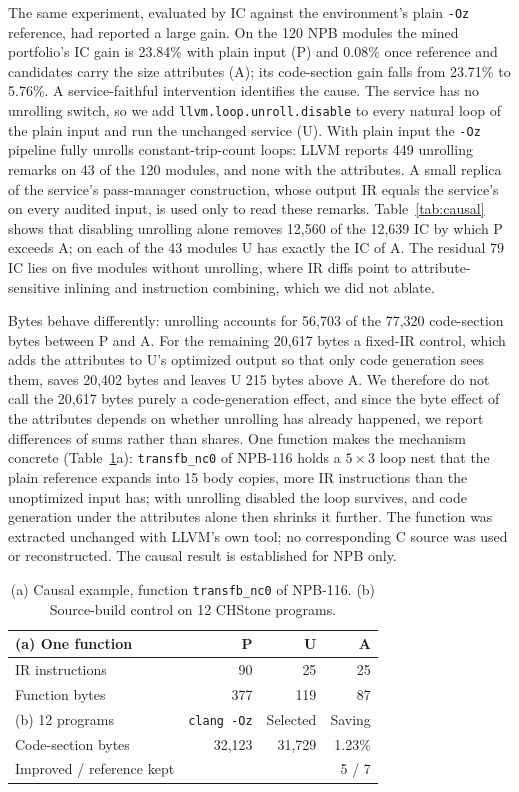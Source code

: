 \documentclass[conference,a4paper]{IEEEtran}
\begin{document}
The same experiment, evaluated by IC against the environment's plain
\texttt{-Oz} reference, had reported a large gain. On the 120 NPB
modules the mined portfolio's IC gain is 23.84\% with plain input (P)
and 0.08\% once reference and candidates carry the size attributes (A);
its code-section gain falls from 23.71\% to 5.76\%. A service-faithful
intervention identifies the cause. The service has no unrolling switch,
so we add \texttt{llvm.loop.unroll.disable} to every natural loop of
the plain input and run the unchanged service (U). With plain input the
\texttt{-Oz} pipeline fully unrolls constant-trip-count loops: LLVM
reports 449 unrolling remarks on 43 of the 120 modules, and none with
the attributes. A small replica of the service's pass-manager
construction, whose output IR equals the service's on every audited
input, is used only to read these remarks. Table~\ref{tab:causal} shows
that disabling unrolling alone removes 12,560 of the 12,639 IC by which
P exceeds A; on each of the 43 modules U has exactly the IC of A. The
residual 79 IC lies on five modules without unrolling, where IR diffs
point to attribute-sensitive inlining and instruction combining, which
we did not ablate.

Bytes behave differently: unrolling accounts for 56,703 of the 77,320
code-section bytes between P and A. For the remaining 20,617 bytes a
fixed-IR control, which adds the attributes to U's optimized output so
that only code generation sees them, saves 20,402 bytes and leaves U
215 bytes above A. We therefore do not call the 20,617 bytes purely a
code-generation effect, and since the byte effect of the attributes
depends on whether unrolling has already happened, we report
differences of sums rather than shares. One function makes the
mechanism concrete (Table~\ref{tab:small}a): \texttt{transfb\_nc0} of
NPB-116 holds a $5{\times}3$ loop nest that the plain reference expands
into 15 body copies, more IR instructions than the unoptimized input
has; with unrolling disabled the loop survives, and code generation
under the attributes alone then shrinks it further. The function was
extracted unchanged with LLVM's own tool; no corresponding C source was
used or reconstructed. The causal result is established for NPB only.



\begin{table}[t]
\caption{(a) Causal example, function \texttt{transfb\_nc0} of NPB-116.
(b) Source-build control on 12 CHStone programs.}
\label{tab:small}
\centering
\footnotesize
\setlength{\tabcolsep}{4pt}
\begin{tabular}{lrrr}
\toprule
(a) One function & P & U & A \\
\midrule
IR instructions & 90 & 25 & 25 \\
Function bytes  & 377 & 119 & 87 \\
\midrule
(b) 12 programs & \texttt{clang -Oz} & Selected & Saving \\
\midrule
Code-section bytes & 32,123 & 31,729 & 1.23\% \\
Improved / reference kept & \multicolumn{3}{r}{5 / 7} \\
\bottomrule
\end{tabular}
\end{table}
\end{document}
